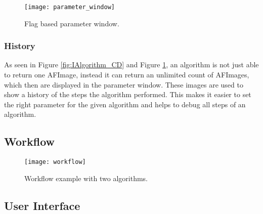 \begin{figure}[h]
  \centering
      \texttt{[image: parameter\_window]}
  \caption{Flag based parameter window.}
  \label{fig:parameter_window}
\end{figure}

\subsubsection{History}
As seen in Figure \ref{fig:IAlgorithm_CD} and Figure \ref{fig:parameter_window}, an algorithm is not just able to return one AFImage, instead it can return an unlimited count of AFImages, which then are displayed in the parameter window. These images are used to show a history of the steps the algorithm performed. This makes it easier to set the right parameter for the given algorithm and helps to debug all steps of an algorithm.

\subsection{Workflow}


\begin{figure}[h]
  \centering
      \texttt{[image: workflow]}
  \caption{Workflow example with two algorithms.}
  \label{fig:Workflow}
\end{figure}

\subsection{User Interface}
